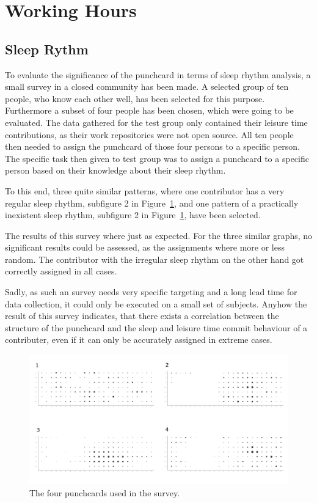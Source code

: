 \section{Working Hours}

\subsection{Sleep Rythm}
To evaluate the significance of the punchcard in terms of sleep rhythm analysis, a small survey in a closed community has been made.
A selected group of ten people, who know each other well, has been selected for this purpose.
Furthermore a subset of four people has been chosen, which were going to be evaluated.
The data gathered for the test group only contained their leisure time contributions, as their work repositories were not open source.
All ten people then needed to assign the punchcard of those four persons to a specific person.
The specific task then given to test group was to assign a punchcard to a specific person based on their knowledge about their sleep rhythm.


To this end, three quite similar patterns, where one contributor has a very regular sleep rhythm, subfigure 2 in Figure~\ref{fig:punchcard-survey}, and one pattern of a practically inexistent sleep rhythm, subfigure 2 in Figure~\ref{fig:punchcard-survey}, have been selected.

The results of this survey where just as expected.
For the three similar graphs, no significant results could be assessed, as the assignments where more or less random.
The contributor with the irregular sleep rhythm on the other hand got correctly assigned in all cases.

Sadly, as such an survey needs very specific targeting and a long lead time for data collection, it could only be executed on a small set of subjects.
Anyhow the result of this survey indicates, that there exists a correlation between the structure of the punchcard and the sleep and leisure time commit behaviour of a contributer, even if it can only be accurately assigned in extreme cases.


\begin{figure}[H]
    \includegraphics[scale=0.16]{./graphs/analysis/survey_combined}
    \centering
    \caption{The four punchcards used in the survey.}\label{fig:punchcard-survey}
\end{figure}

